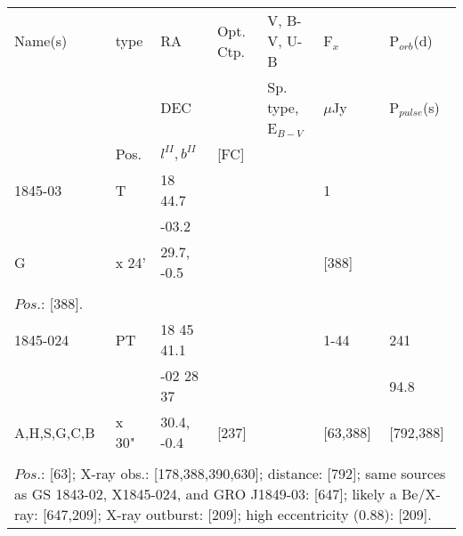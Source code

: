 \documentclass{aa}
\begin{document}
\clearpage\begin{table*}[h]
\begin{tabular}{p{2.5cm}p{1cm}p{1.8cm}p{2.3cm}p{3.3cm}p{2.0cm}p{2.2cm}}
\noalign{\smallskip}
\multicolumn{7}{p{17.5cm}}{Table 1.  (continued) }\\        
\hline
\noalign{\smallskip}
Name(s)      & type  & RA                  &  Opt. Ctp. & V, B-V, U-B                    &   F$_{x}$           & P$_{orb}$(d)    \\
                      &            &  DEC              &                     &  Sp. type, E$_{B-V}$  &    $\mu$Jy & P$_{pulse}$(s) \\
                      & Pos.  &  $l^{II}, b^{II}$     &  [FC]           &                                          &                            &                             \\
\noalign{\smallskip} 
\hline
\noalign{\smallskip}
 1845-03      &  T       & 18 44.7        &                    &                      & 1                 &                        \\
                      &           & -03.2           &                    &                     &                           &          \\
G             & x 24'          & 29.7, -0.5  &                     &                      & [388]        &           \\
\\
\multicolumn{7}{p{17.5cm}}{
$Pos$.: [388].}\\

\noalign{\smallskip}
\hline
\noalign{\smallskip}
 1845-024           & PT              & 18 45 41.1     &                       &                      & 1-44              &  241      \\
                             &                    & -02 28 37       &                        &                      &                        &   94.8   \\
A,H,S,G,C,B      & x 30"          & 30.4, -0.4      &   [237]             &                      & [63,388]        &  [792,388]    \\

\\
\multicolumn{7}{p{17.5cm}}{
$Pos$.: [63]; X-ray obs.: [178,388,390,630]; distance: [792]; same sources as GS 1843-02, X1845-024, and GRO J1849-03: 
[647]; likely a Be/X-ray: [647,209]; X-ray outburst: [209]; high eccentricity (0.88): [209].   }\\


\end{tabular}
\end{table*}
\end{document}
